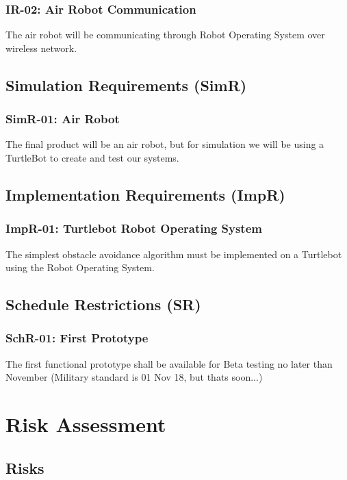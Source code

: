 \documentclass[]{report}
\begin{document}
\subsection{IR-02: Air Robot Communication}
The air robot will be communicating through Robot Operating System over wireless network.


\section{Simulation Requirements (SimR)}

\subsection{SimR-01: Air Robot}
The final product will be an air robot, but for simulation we will be using a TurtleBot to create and test our systems. 


\section{Implementation Requirements (ImpR)}

\subsection{ImpR-01: Turtlebot Robot Operating System}
The simplest obstacle avoidance algorithm must be implemented on a Turtlebot using the Robot Operating System.


\section{Schedule Restrictions (SR)}

\subsection{SchR-01: First Prototype}

The first functional prototype shall be available for Beta testing no later than November  (Military standard is 01 Nov 18, but thats soon...)

\chapter{Risk Assessment}

\section{Risks}
\end{document}
